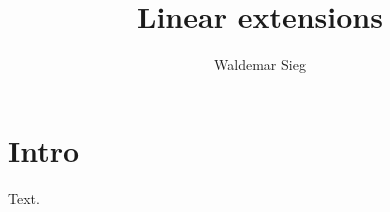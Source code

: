 \documentclass{elsarticle}
\makeatletter
\newcommand{\subjclass}[2][2010]{%
  \let\@oldtitle\@title
  \gdef\@title{\@oldtitle\footnotetext{#1 \emph{Mathematics subject classification.} #2}}}
\makeatother
\begin{document}
\begin{frontmatter}
\title{Linear extensions}
\author{Waldemar Sieg}
\subjclass{Primary: 26A15; Secondary: 26A21.}
\end{frontmatter}
\section{Intro}
Text.
\end{document}
